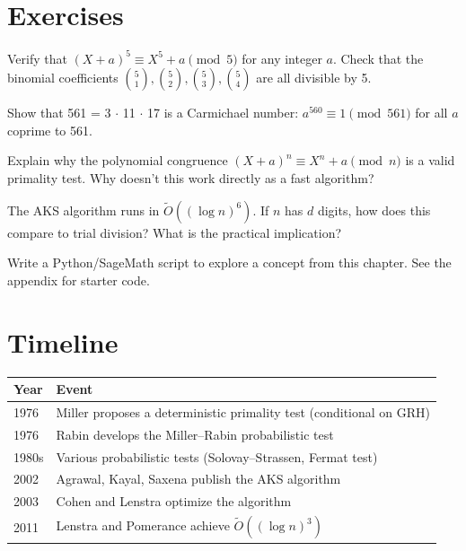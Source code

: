 \section{Exercises}

\begin{exercise}[Basic]
Verify that $(X + a)^5 \equiv X^5 + a \pmod{5}$ for any integer $a$. Check that the binomial coefficients $\binom{5}{1}, \binom{5}{2}, \binom{5}{3}, \binom{5}{4}$ are all divisible by 5.
\end{exercise}

\begin{exercise}[Intermediate]
Show that 561 = 3 $\cdot$ 11 $\cdot$ 17 is a Carmichael number: $a^{560} \equiv 1 \pmod{561}$ for all $a$ coprime to 561.
\end{exercise}

\begin{exercise}[Challenge]
Explain why the polynomial congruence $(X+a)^n \equiv X^n + a \pmod{n}$ is a valid primality test. Why doesn't this work directly as a fast algorithm?
\end{exercise}

\begin{exercise}
The AKS algorithm runs in $\tilde{O}((\log n)^6)$. If $n$ has $d$ digits, how does this compare to trial division? What is the practical implication?
\end{exercise}


\begin{exercise}[Computational]
Write a Python/SageMath script to explore a concept from this chapter. See the appendix for starter code.
\end{exercise}

\section{Timeline}

\begin{tabularx}{\linewidth}{lX}
\toprule
\textbf{Year} & \textbf{Event} \\ \midrule
1976 & Miller proposes a deterministic primality test (conditional on GRH) \\ 
1976 & Rabin develops the Miller--Rabin probabilistic test \\ 
1980s & Various probabilistic tests (Solovay--Strassen, Fermat test) \\ 
2002 & Agrawal, Kayal, Saxena publish the AKS algorithm \cite{agrawal2004} \\ 
2003 & Cohen and Lenstra optimize the algorithm \cite{bernstein2006} \\ 
2011 & Lenstra and Pomerance achieve $\tilde{O}((\log n)^3)$ \cite{lenstra2011} \\ \bottomrule
\end{tabularx}

